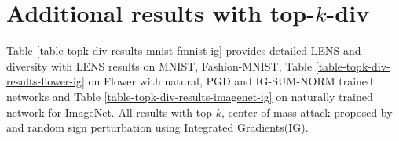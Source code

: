 \documentclass[letterpaper]{article} %
\begin{document}



\section{Additional results with top-$k$-div} \label{app:extra-div-results}
Table \ref{table-topk-div-results-mnist-fmnist-ig}  provides detailed LENS and diversity with LENS results on MNIST, Fashion-MNIST, Table \ref{table-topk-div-results-flower-ig} on Flower with natural, PGD and IG-SUM-NORM trained networks and Table \ref{table-topk-div-results-imagenet-ig} on naturally trained network for ImageNet. All results with top-$k$, center of mass attack proposed by \citet{ghorbani2018interpretation} and random sign perturbation using Integrated Gradients(IG).
\end{document}
